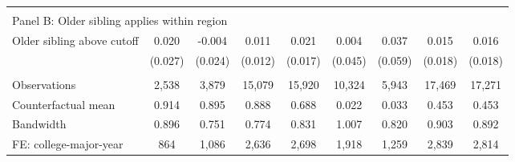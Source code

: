 {{\begin{tabular}{lcccccccc}
&  &  &  & & & & & &    \\
\multicolumn{9}{l}{Panel B: Older sibling applies within region} \\
Older sibling above cutoff&       0.020   &      -0.004   &       0.011   &       0.021   &       0.004   &       0.037   &       0.015   &       0.016   \\
                    &     (0.027)   &     (0.024)   &     (0.012)   &     (0.017)   &     (0.045)   &     (0.059)   &     (0.018)   &     (0.018)   \\
                    &               &               &               &               &               &               &               &               \\
Observations        &       2,538   &       3,879   &      15,079   &      15,920   &      10,324   &       5,943   &      17,469   &      17,271   \\
Counterfactual mean &       0.914   &       0.895   &       0.888   &       0.688   &       0.022   &       0.033   &       0.453   &       0.453   \\
Bandwidth           &       0.896   &       0.751   &       0.774   &       0.831   &       1.007   &       0.820   &       0.903   &       0.892   \\
FE: college-major-year&         864   &       1,086   &       2,636   &       2,698   &       1,918   &       1,259   &       2,839   &       2,814   \\
 

\bottomrule
\end{tabular}
}
}
